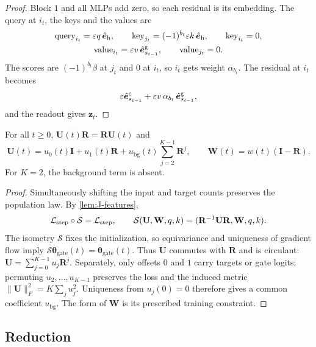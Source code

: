 \begin{proof}
Block $1$ and all MLPs add zero, so each residual is its embedding. The query at $i_t$, the keys and the values are
\begin{gather*}
 \text{query}_{i_t}=\varepsilon q\,\hat{\bm e}_{\mathrm h},\qquad \text{key}_{j_t}=(-1)^{b_t}\varepsilon k\,\hat{\bm e}_{\mathrm h},\qquad \text{key}_{i_t}=0,\\
 \text{value}_{i_t}=\varepsilon v\,\hat{\bm e}^{\mathrm g}_{s_{t-1}},\qquad \text{value}_{j_t}=0 .
\end{gather*}
The scores are $(-1)^{b_t}\beta$ at $j_t$ and $0$ at $i_t$, so $i_t$ gets weight $\alpha_{b_t}$. The residual at $i_t$ becomes
\[
 \varepsilon\hat{\bm e}^{\mathrm c}_{s_{t-1}}+\varepsilon v\,\alpha_{b_t}\,\hat{\bm e}^{\mathrm g}_{s_{t-1}},
\]
and the readout gives $\bm z_t$.
\end{proof}

\begin{lemma}
\label{lem:J-symmetry}
For all $t\ge0$, $\mathbf U(t)\mathbf R=\mathbf R\mathbf U(t)$ and
\[
 \mathbf U(t)=u_0(t)\mathbf I+u_1(t)\mathbf R
 +u_{\mathrm{bg}}(t)\sum_{j=2}^{K-1}\mathbf R^j,\qquad
 \mathbf W(t)=w(t)(\mathbf I-\mathbf R).
\]
For $K=2$, the background term is absent.
\end{lemma}

\begin{proof}
Simultaneously shifting the input and target counts preserves the population law. By \cref{lem:J-features},
\[
 \mathcal L_{\mathrm{step}}\circ\mathcal S=\mathcal L_{\mathrm{step}},\qquad
 \mathcal S(\mathbf U,\mathbf W,q,k)=(\mathbf R^{-1}\mathbf U\mathbf R,\mathbf W,q,k).
\]
The isometry $\mathcal S$ fixes the initialization, so equivariance and uniqueness of gradient flow imply $\mathcal S\bm\theta_{\mathrm{gate}}(t)=\bm\theta_{\mathrm{gate}}(t)$.
Thus $\mathbf U$ commutes with $\mathbf R$ and is circulant: $\mathbf U=\sum_{j=0}^{K-1}u_j\mathbf R^j$.
Separately, only offsets $0$ and $1$ carry targets or gate logits; permuting $u_2,\ldots,u_{K-1}$ preserves the loss and the
induced metric $\|\mathbf U\|_F^2=K\sum_j u_j^2$. Uniqueness from $u_j(0)=0$ therefore gives a common coefficient $u_{\mathrm{bg}}$.
The form of $\mathbf W$ is its prescribed training constraint.
\end{proof}

\subsection{Reduction}

